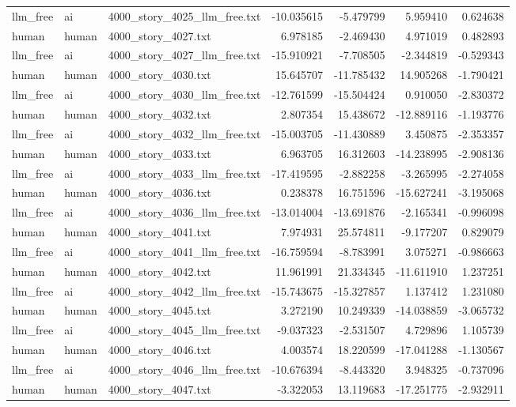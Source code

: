 \begin{longtable}{lllrrrr}
llm\_free & ai & 4000\_story\_4025\_llm\_free.txt & -10.035615 & -5.479799 & 5.959410 & 0.624638 \\
human & human & 4000\_story\_4027.txt & 6.978185 & -2.469430 & 4.971019 & 0.482893 \\
llm\_free & ai & 4000\_story\_4027\_llm\_free.txt & -15.910921 & -7.708505 & -2.344819 & -0.529343 \\
human & human & 4000\_story\_4030.txt & 15.645707 & -11.785432 & 14.905268 & -1.790421 \\
llm\_free & ai & 4000\_story\_4030\_llm\_free.txt & -12.761599 & -15.504424 & 0.910050 & -2.830372 \\
human & human & 4000\_story\_4032.txt & 2.807354 & 15.438672 & -12.889116 & -1.193776 \\
llm\_free & ai & 4000\_story\_4032\_llm\_free.txt & -15.003705 & -11.430889 & 3.450875 & -2.353357 \\
human & human & 4000\_story\_4033.txt & 6.963705 & 16.312603 & -14.238995 & -2.908136 \\
llm\_free & ai & 4000\_story\_4033\_llm\_free.txt & -17.419595 & -2.882258 & -3.265995 & -2.274058 \\
human & human & 4000\_story\_4036.txt & 0.238378 & 16.751596 & -15.627241 & -3.195068 \\
llm\_free & ai & 4000\_story\_4036\_llm\_free.txt & -13.014004 & -13.691876 & -2.165341 & -0.996098 \\
human & human & 4000\_story\_4041.txt & 7.974931 & 25.574811 & -9.177207 & 0.829079 \\
llm\_free & ai & 4000\_story\_4041\_llm\_free.txt & -16.759594 & -8.783991 & 3.075271 & -0.986663 \\
human & human & 4000\_story\_4042.txt & 11.961991 & 21.334345 & -11.611910 & 1.237251 \\
llm\_free & ai & 4000\_story\_4042\_llm\_free.txt & -15.743675 & -15.327857 & 1.137412 & 1.231080 \\
human & human & 4000\_story\_4045.txt & 3.272190 & 10.249339 & -14.038859 & -3.065732 \\
llm\_free & ai & 4000\_story\_4045\_llm\_free.txt & -9.037323 & -2.531507 & 4.729896 & 1.105739 \\
human & human & 4000\_story\_4046.txt & 4.003574 & 18.220599 & -17.041288 & -1.130567 \\
llm\_free & ai & 4000\_story\_4046\_llm\_free.txt & -10.676394 & -8.443320 & 3.948325 & -0.737096 \\
human & human & 4000\_story\_4047.txt & -3.322053 & 13.119683 & -17.251775 & -2.932911 \\

\end{longtable}
